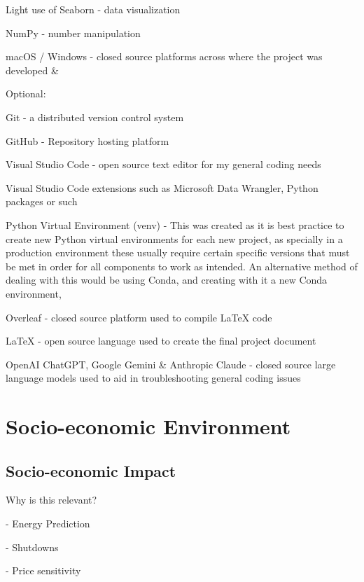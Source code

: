 \documentclass[12pt]{report} %
\begin{document}
Light use of Seaborn - data visualization \cite{seaborn}

NumPy - number manipulation \cite{numpy}

macOS / Windows - closed source platforms across where the project was developed \cite{macos} \& \cite{windows}

Optional:

Git - a distributed version control system \cite{git}

GitHub - Repository hosting platform \cite{github}

Visual Studio Code - open source text editor for my general coding needs \cite{vscode}

Visual Studio Code extensions such as Microsoft Data Wrangler, Python packages or such

Python Virtual Environment (venv) - This was created as it is best practice to create new Python virtual environments for each new project, as specially in a production environment these usually require certain specific versions that must be met in order for all components to work as intended. An alternative method of dealing with this would be using Conda, and creating with it a new Conda environment, \cite{python_venv}

Overleaf - closed source platform used to compile LaTeX code \cite{overleaf}

LaTeX - open source language used to create the final project document \cite{latex}

OpenAI ChatGPT, Google Gemini \& Anthropic Claude - closed source large language models used to aid in troubleshooting general coding issues



\chapter{Socio-economic Environment}
\section{Socio-economic Impact}

Why is this relevant?

- Energy Prediction

- Shutdowns

- Price sensitivity
\end{document}
